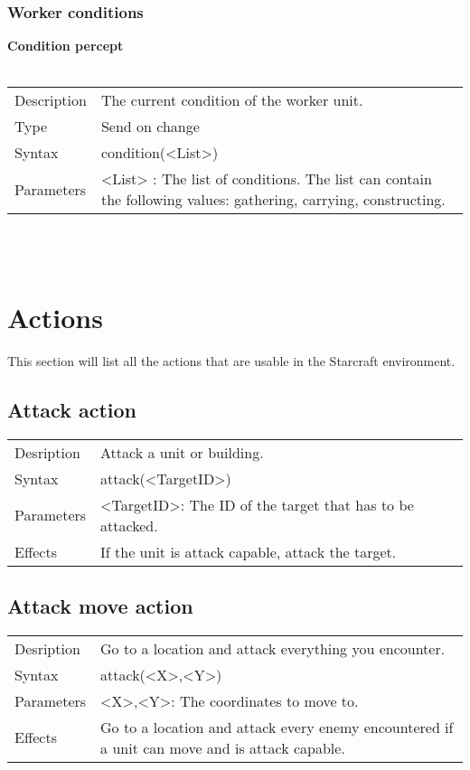 \documentclass[english,11pt]{report}
\begin{document}
\subsection{Worker conditions}
\textbf{Condition percept}\\
\\
\begin{tabularx}{\textwidth}{lX}
 Description & The current condition of the worker unit. \\
 Type & Send on change \\
 Syntax & condition(<List>) \\
 Parameters &  <List> : The list of conditions. The list can contain the following values: gathering, carrying, constructing. 
\end{tabularx} \\
\\

\chapter{Actions}
This section will list all the actions that are usable in the Starcraft environment.

\section{Attack action}
\begin{tabularx}{\textwidth}{lX}
 Desription & Attack a unit or building. \\
 Syntax & attack(<TargetID>) \\
 Parameters & <TargetID>: The ID of the target that has to be attacked.\\
 Effects &  If the unit is attack capable, attack the target.
\end{tabularx}

\section{Attack move action}
\begin{tabularx}{\textwidth}{lX}
 Desription & Go to a location and attack everything you encounter. \\
 Syntax & attack(<X>,<Y>) \\
 Parameters & <X>,<Y>: The coordinates to move to.\\
 Effects &  Go to a location and attack every enemy encountered if a unit can move and is attack capable.
\end{tabularx}
\end{document}
